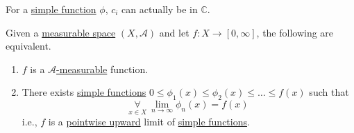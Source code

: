 \begin{prev}
	For a \hyperref[def:simple-function]{simple function} \(\phi\), \(c_{i}\) can actually be in \(\mathbb{C} \).
\end{prev}

\begin{theorem}
	Given a \hyperref[def:measurable-space]{measurable space} \((X, \mathcal{A} )\) and let \(f\colon X\to [0, \infty ]\), the following are equivalent.
	\begin{enumerate}[(1)]
		\item \(f\) is a \hyperref[def:A-measurable-function]{\(\mathcal{A} \)-measurable} function.
		\item There exists \hyperref[def:simple-function]{simple functions} \(0\leq \phi_1(x)\leq \phi_2(x)\leq \dots \leq f(x) \) such that
		      \[
			      \underset{x\in X}{\forall }\ \lim\limits_{n \to \infty} \phi _{n}(x) = f(x)
		      \]
		      i.e., \(f\) is a \underline{\hyperref[def:pointwise-convergence]{pointwise} upward} limit of \hyperref[def:simple-function]{simple functions}.
	\end{enumerate}
\end{theorem}
